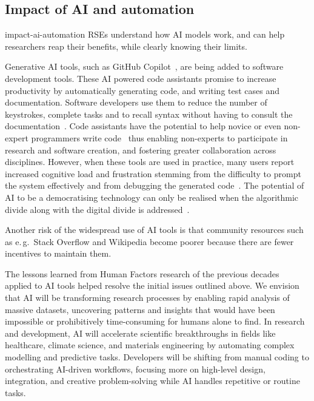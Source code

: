 \documentclass{eceasst}
\newcommand{\eg}{e.\,g.}
\begin{document}
\subsection{Impact of AI and automation}
\label{sec:ai}
\begin{whatis}{}{impact-ai-automation}
RSEs understand how AI models work, and can help researchers reap their benefits, while
clearly knowing their limits.
\end{whatis}
Generative AI tools, such as GitHub Copilot~\cite{Friedmann2021},
are being added to software development tools.
These AI powered code assistants promise to increase productivity
by automatically generating code, and writing test cases and documentation.
Software developers use them to reduce the number of keystrokes,
complete tasks and to recall syntax without having to consult the documentation~\cite{Liang2024}.
Code assistants have the potential to help novice or even non-expert programmers
write code~\cite{Feldman2024} thus enabling non-experts to participate in research
and software creation, and fostering greater collaboration across disciplines.
However, when these tools are used in practice, many users report increased cognitive
load and frustration stemming from the difficulty to prompt the system effectively
and from debugging the generated code~\cite{Simkute2025}.
The potential of AI to be a democratising technology can only be realised
when the algorithmic divide along with the digital divide is addressed~\cite{Yu2020}.

Another risk of the widespread use of AI tools is that community resources
such as \eg\ Stack Overflow and Wikipedia become poorer because there are fewer incentives to maintain them.

The lessons learned from Human Factors research of the previous decades~\cite{Simkute2025}
applied to AI tools helped resolve the initial issues outlined above.
We envision that AI will be transforming research processes by enabling rapid analysis of massive datasets,
uncovering patterns and insights that would have been impossible or prohibitively time-consuming for humans alone to find.
In research and development, AI will accelerate scientific breakthroughs in fields like healthcare,
climate science, and materials engineering by automating complex modelling and predictive tasks.
Developers will be shifting from manual coding to orchestrating AI-driven workflows,
focusing more on high-level design, integration, and creative problem-solving while AI handles repetitive or routine tasks.
\end{document}
